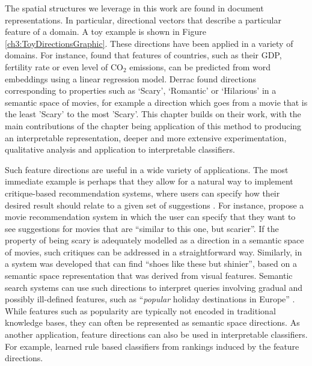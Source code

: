 The spatial structures we leverage in this work are found in document representations. In particular, directional vectors that describe a particular feature of a domain. A toy example is shown in Figure \ref{ch3:ToyDirectionsGraphic}. These directions have been applied in a variety of domains. For instance,  \cite{gupta2015distributional} found that features of countries, such as their GDP, fertility rate or even level of CO$_2$ emissions, can be predicted from word embeddings using a linear regression model.  Derrac \cite{Derrac2015}  found directions corresponding to properties such as `Scary', `Romantic' or `Hilarious' in a semantic space of movies, for example a direction which goes from a movie that is the least 'Scary' to the most 'Scary'. This chapter builds on their work, with the main contributions of the chapter being application of this method to producing an interpretable representation, deeper and more extensive experimentation, qualitative analysis and application to interpretable classifiers.  %

Such feature directions are useful in a wide variety of applications. The most immediate example is perhaps that they allow for a natural way to implement critique-based recommendation systems, where users can specify how their desired result should relate to a given set of suggestions \cite{Viappiani2006}. For instance, \cite{Vig2014} propose a movie recommendation system in which the user can specify that they want to see suggestions for movies that are ``similar to this one, but scarier''. If the property of being scary is adequately modelled as a direction in a semantic space of movies, such critiques can be addressed in a straightforward way. Similarly, in \cite{Kovashka} a system was developed that can find ``shoes like these but shinier'', based on a semantic space representation that was derived from visual features. Semantic search systems can use such directions to interpret queries involving gradual and possibly ill-defined features, such as ``\emph{popular} holiday destinations in Europe'' \cite{Jameel}. While features such as popularity are typically not encoded in traditional knowledge bases, they can often be represented as semantic space directions.  As another application, feature directions can also be used in interpretable classifiers. For example, \cite{Derrac2015} learned rule based classifiers from rankings induced by the feature directions.

